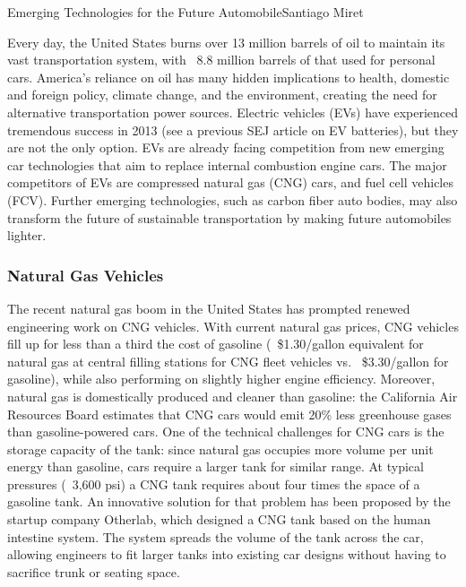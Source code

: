 \documentclass[10pt]{papertex}
\begin{document}
\makeatletter
\renewcommand{\papertex@headDateTime}{
    \raisebox{-5pt}
    {\fontsize{5mm}{6mm}\usefont{T1}{bch}{b}{n}{April 2014}}
    }
\makeatother

\begin{news}{2}{Emerging Technologies for the Future Automobile}{Santiago Miret}{}{}

Every day, the United States burns over 13 million barrels of oil to maintain
its vast transportation system, with ~8.8 million barrels of that used for
personal cars. America's reliance on oil has many hidden implications to health,
domestic and foreign policy, climate change, and the environment, creating the
need for alternative transportation power sources. Electric vehicles (EVs) have
experienced tremendous success in 2013 (see a previous SEJ article on EV
batteries), but they are not the only option. EVs are already facing competition
from new emerging car technologies that aim to replace internal combustion
engine cars. The major competitors of EVs are compressed natural gas (CNG) cars,
and fuel cell vehicles (FCV). Further emerging technologies, such as carbon
fiber auto bodies, may also transform the future of sustainable transportation
by making future automobiles lighter.

\subsubsection*{Natural Gas Vehicles}

The recent natural gas boom in the United States has prompted renewed
engineering work on CNG vehicles. With current natural gas prices, CNG vehicles
fill up for less than a third the cost of gasoline (~\$1.30/gallon equivalent
for natural gas at central filling stations for CNG fleet vehicles vs.
~\$3.30/gallon for gasoline), while also performing on slightly higher engine
efficiency. Moreover, natural gas is domestically produced and cleaner than
gasoline: the California Air Resources Board estimates that CNG cars would emit
20\% less greenhouse gases than gasoline-powered cars. One of the technical
challenges for CNG cars is the storage capacity of the tank: since natural gas
occupies more volume per unit energy than gasoline, cars require a larger tank
for similar range. At typical pressures (~3,600 psi) a CNG tank requires about
four times the space of a gasoline tank. An innovative solution for that problem
has been proposed by the startup company Otherlab, which designed a CNG tank
based on the human intestine system. The system spreads the volume of the tank
across the car, allowing engineers to fit larger tanks into existing car designs
without having to sacrifice trunk or seating space.


\end{news}
\end{document}
